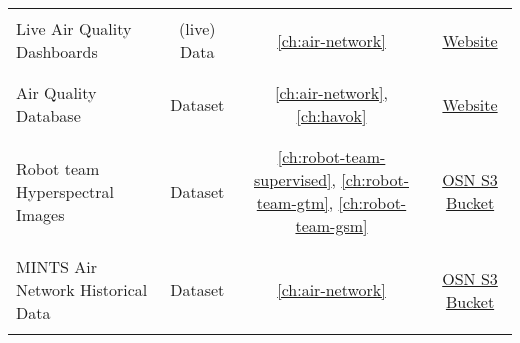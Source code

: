 \begin{table}[!h]
\begin{center}
{\begin{tabular}{lccc}
      & & & \\
      Live Air Quality Dashboards & (live) Data & \ref{ch:air-network} & \href{http://mdash.circ.utdallas.edu:3000}{Website} \\
      & & & \\ \hline
      & & & \\
      Air Quality Database & Dataset & \ref{ch:air-network},\ref{ch:havok} & \href{http://mdash.circ.utdallas.edu:8086}{Website} \\
      & & & \\ \hline
      & & & \\
      Robot team Hyperspectral Images & Dataset & \ref{ch:robot-team-supervised}, \ref{ch:robot-team-gtm}, \ref{ch:robot-team-gsm} & \href{https://ncsa.oxn.xsede.org/ees230012-bucket01}{OSN S3 Bucket} \\
      & & & \\ \hline
      & & & \\
      MINTS Air Network Historical Data  & Dataset & \ref{ch:air-network} & \href{https://ncsa.oxn.xsede.org/ees230012-bucket01}{OSN S3 Bucket} \\
      & & & \\ \hline
    \end{tabular}}
  \end{center}
\end{table}














